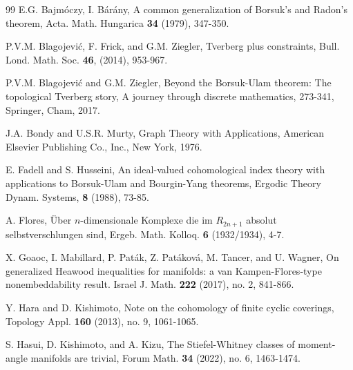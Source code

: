 \documentclass[amsfonts]{amsart}
\numberwithin{equation}{section}
\theoremstyle{definition}
\theoremstyle{remark}
\begin{document}
  \begin{thebibliography}{99}
     E.G. Bajm\'oczy, I. B\'ar\'any, A common generalization of Borsuk's and Radon's theorem, Acta. Math. Hungarica \textbf{34} (1979), 347-350.

     P.V.M. Blagojevi\'{c}, F. Frick, and G.M. Ziegler, Tverberg plus constraints, Bull. Lond. Math. Soc. \textbf{46}, (2014), 953-967.

     P.V.M. Blagojevi\'{c} and G.M. Ziegler, Beyond the Borsuk-Ulam theorem: The topological Tverberg story, A journey through discrete mathematics, 273-341, Springer, Cham, 2017.

     J.A. Bondy and U.S.R. Murty, Graph Theory with Applications, American Elsevier Publishing Co., Inc., New York, 1976.


     E. Fadell and S. Husseini, An ideal-valued cohomological index theory with applications to Borsuk-Ulam and Bourgin-Yang theorems, Ergodic Theory Dynam. Systems, \textbf{8} (1988), 73-85.


     A. Flores, \"Uber $n$-dimensionale Komplexe die im $R_{2n+1}$ absolut selbstverschlungen sind, Ergeb. Math. Kolloq. \textbf{6} (1932/1934), 4-7.


     X. Goaoc, I. Mabillard, P. Pat\'{a}k, Z. Pat\'{a}kov\'{a}, M. Tancer, and U. Wagner, On generalized Heawood inequalities for manifolds: a van Kampen-Flores-type nonembeddability result. Israel J. Math. \textbf{222} (2017), no. 2, 841-866.

     Y. Hara and D. Kishimoto, Note on the cohomology of finite cyclic coverings, Topology Appl. \textbf{160} (2013), no. 9, 1061-1065.

     S. Hasui, D. Kishimoto, and A. Kizu, The Stiefel-Whitney classes of moment-angle manifolds are trivial, Forum Math. \textbf{34} (2022), no. 6, 1463-1474.


\end{thebibliography}
\end{document}
